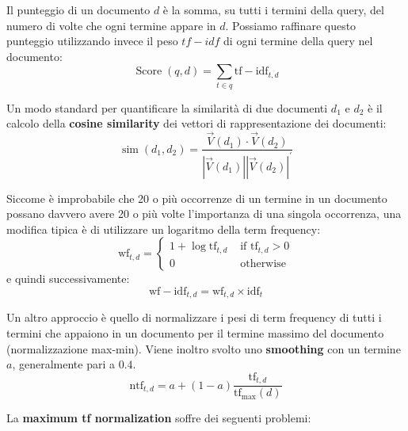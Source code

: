 \documentclass[\main/main.tex]{subfiles}
\begin{document}
\begin{multicols}{2}
\begin{definition}
    Il punteggio di un documento \(d\) è la somma, su tutti i termini della query, del numero di volte che ogni termine appare in \(d\). Possiamo raffinare questo punteggio utilizzando invece il peso \(tf-idf\) di ogni termine della query nel documento:
    \[
        \operatorname{Score}(q, d)=\sum_{t \in q} \mathrm{tf}-\mathrm{idf}_{t, d}
    \]
\end{definition}
\begin{observation}
    Un modo standard per quantificare la similarità di due documenti \(d_1\) e \(d_2\) è il calcolo della \textbf{cosine similarity} dei vettori di rappresentazione dei documenti:
    \[
        \operatorname{sim}\left(d_{1}, d_{2}\right)=\frac{\vec{V}\left(d_{1}\right) \cdot \vec{V}\left(d_{2}\right)}{\left|\vec{V}\left(d_{1}\right)\right|\left|\vec{V}\left(d_{2}\right)\right|^{\prime}}
    \]
\end{observation}
\begin{definition}
    Siccome è improbabile che 20 o più occorrenze di un termine in un documento possano davvero avere 20 o più volte l'importanza di una singola occorrenza, una modifica tipica è di utilizzare un logaritmo della term frequency:
    \[
        \mathrm{wf}_{t, d}=\left\{\begin{array}{ll}{1+\log \mathrm{tf}_{t, d}} & {\text { if } \mathrm{tf}_{t, d}>0} \\ {0} & {\text { otherwise }}\end{array}\right.
    \]
    e quindi successivamente:
    \[
        \mathrm{wf}-\mathrm{idf}_{t, d}=\mathrm{wf}_{t, d} \times \mathrm{idf}_{t}
    \]
\end{definition}
\begin{definition}
    Un altro approccio è quello di normalizzare i pesi di term frequency di tutti i termini che appaiono in un documento per il termine massimo del documento (normalizzazione max-min). Viene inoltro svolto uno \textbf{smoothing} con un termine \(a\), generalmente pari a \(0.4\).
    \[
        \mathrm{ntf}_{t, d}=a+(1-a) \frac{\mathrm{tf}_{t, d}}{\mathrm{tf}_{\max }(d)}
    \]
\end{definition}
\begin{observation}
    La \textbf{maximum tf normalization} soffre dei seguenti problemi:
    \begin{enumerate}

\end{enumerate}
\end{observation}
\end{multicols}
\end{document}
